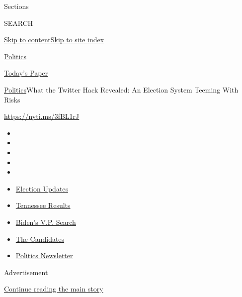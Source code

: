 Sections

SEARCH

\protect\hyperlink{site-content}{Skip to
content}\protect\hyperlink{site-index}{Skip to site index}

\href{https://www.nytimes.com/section/politics}{Politics}

\href{https://myaccount.nytimes.com/auth/login?response_type=cookie\&client_id=vi}{}

\href{https://www.nytimes.com/section/todayspaper}{Today's Paper}

\href{/section/politics}{Politics}\textbar{}What the Twitter Hack
Revealed: An Election System Teeming With Risks

\href{https://nyti.ms/3fBL1rJ}{https://nyti.ms/3fBL1rJ}

\begin{itemize}
\item
\item
\item
\item
\item
\end{itemize}

\begin{itemize}
\item
  \href{https://www.nytimes.com/2020/08/07/us/elections/biden-vs-trump.html?action=click\&pgtype=Article\&state=default\&region=TOP_BANNER\&context=storylines_menu}{Election
  Updates}
\item
  \href{https://www.nytimes.com/interactive/2020/08/06/us/elections/results-tennessee-primary-elections.html?action=click\&pgtype=Article\&state=default\&region=TOP_BANNER\&context=storylines_menu}{Tennessee
  Results}
\item
  \href{https://www.nytimes.com/article/biden-vice-president-2020.html?action=click\&pgtype=Article\&state=default\&region=TOP_BANNER\&context=storylines_menu}{Biden's
  V.P. Search}
\item
  \href{https://www.nytimes.com/interactive/2019/us/politics/2020-presidential-candidates.html?action=click\&pgtype=Article\&state=default\&region=TOP_BANNER\&context=storylines_menu}{The
  Candidates}
\item
  \href{https://www.nytimes.com/newsletters/politics?action=click\&pgtype=Article\&state=default\&region=TOP_BANNER\&context=storylines_menu}{Politics
  Newsletter}
\end{itemize}

Advertisement

\protect\hyperlink{after-top}{Continue reading the main story}

